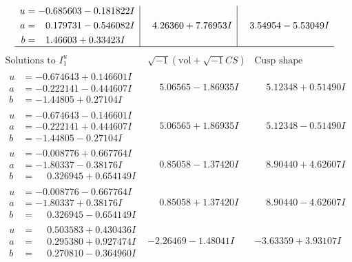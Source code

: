 \documentclass[1p]{elsarticle_modified}
\theoremstyle{definition}
\newcommand{\I}{\sqrt{-1}}
\begin{document}
$$\begin{array}{c|c|c}
\begin{aligned}
u &= -0.685603 - 0.181822 I \\
a &= \phantom{-}0.179731 - 0.546082 I \\
b &= \phantom{-}1.46603 + 0.33423 I\end{aligned}
 & \phantom{-}4.26360 + 7.76953 I & \phantom{-}3.54954 - 5.53049 I\\
 \hline 
 \end{array}$$\newpage$$\begin{array}{c|c|c}  
\text{Solutions to }I^u_{1}& \I (\text{vol} + \sqrt{-1}CS) & \text{Cusp shape}\\
 \hline 
\begin{aligned}
u &= -0.674643 + 0.146601 I \\
a &= -0.222141 - 0.444607 I \\
b &= -1.44805 + 0.27104 I\end{aligned}
 & \phantom{-}5.06565 - 1.86935 I & \phantom{-}5.12348 + 0.51490 I \\ \hline\begin{aligned}
u &= -0.674643 - 0.146601 I \\
a &= -0.222141 + 0.444607 I \\
b &= -1.44805 - 0.27104 I\end{aligned}
 & \phantom{-}5.06565 + 1.86935 I & \phantom{-}5.12348 - 0.51490 I \\ \hline\begin{aligned}
u &= -0.008776 + 0.667764 I \\
a &= -1.80337 - 0.38176 I \\
b &= \phantom{-}0.326945 + 0.654149 I\end{aligned}
 & \phantom{-}0.85058 - 1.37420 I & \phantom{-}8.90440 + 4.62607 I \\ \hline\begin{aligned}
u &= -0.008776 - 0.667764 I \\
a &= -1.80337 + 0.38176 I \\
b &= \phantom{-}0.326945 - 0.654149 I\end{aligned}
 & \phantom{-}0.85058 + 1.37420 I & \phantom{-}8.90440 - 4.62607 I \\ \hline\begin{aligned}
u &= \phantom{-}0.503583 + 0.430436 I \\
a &= \phantom{-}0.295380 + 0.927474 I \\
b &= \phantom{-}0.270810 - 0.364960 I\end{aligned}
 & -2.26469 - 1.48041 I & -3.63359 + 3.93107 I \\ \hline\begin{aligned}

\end{aligned}
\end{array}$$
\end{document}

